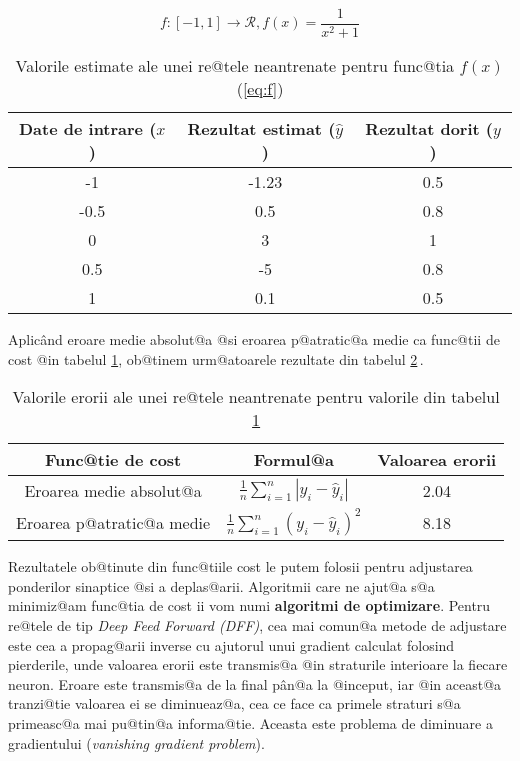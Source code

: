 \begin{equation} \label{eq:f}
	f:[-1, 1]\rightarrow \mathcal{R}, f(x) = \displaystyle\frac{1}{x^2+1}
\end{equation}

\begin{table}[h]
	\begin{center}
		\begin{tabular}{|c|c|c|}
			\hline
			Date de intrare ($x$) & Rezultat estimat ($\hat{y}$) & Rezultat dorit ($y$) \\
			\hline
			-1 & -1.23 & 0.5 \\
			\hline
			-0.5 & 0.5 & 0.8 \\
			\hline
			0 & 3 & 1 \\
			\hline
			0.5 & -5 & 0.8 \\ 
			\hline
			1 & 0.1 & 0.5 \\ 
			\hline
		\end{tabular}
	\end{center}
	\caption{Valorile estimate ale unei re@tele neantrenate pentru func@tia $f(x)$ (\ref{eq:f})}
	\label{tab:nn-functie}
\end{table}

Aplic\^ and eroare medie absolut@a @si eroarea p@atratic@a medie ca func@tii de cost @in tabelul \ref{tab:nn-functie}, ob@tinem urm@atoarele rezultate din tabelul \ref{tab:nn-erori}\,.

\begin{table}[h]
	\begin{center}
		\begin{tabular}{|c|c|c|}
			\hline
			Func@tie de cost & Formul@a & Valoarea erorii \\
			\hline
			Eroarea medie absolut@a & $\displaystyle\frac{1}{n} \sum_{i=1}^{n} |y_i - \hat{y}_i| $ & 2.04 \\
			\hline
			Eroarea p@atratic@a medie & $\displaystyle\frac{1}{n} \sum_{i=1}^{n} \left( y_i - \hat{y}_i \right)^2 $ & 8.18 \\
			\hline
		\end{tabular}
	\end{center}
	\caption{Valorile erorii ale unei re@tele neantrenate pentru valorile din tabelul \ref{tab:nn-functie}}
	\label{tab:nn-erori}
\end{table}

Rezultatele ob@tinute din func@tiile cost le putem folosii pentru adjustarea ponderilor sinaptice @si a deplas@arii. Algoritmii care ne ajut@a s@a minimiz@am func@tia de cost ii vom numi \textbf{algoritmi de optimizare}. Pentru re@tele de tip \textsl{Deep Feed Forward (DFF)}, cea mai comun@a metode de adjustare este cea a propag@arii inverse cu ajutorul unui gradient calculat folosind pierderile, unde valoarea erorii este transmis@a @in straturile interioare la fiecare neuron. Eroare este transmis@a de la final p\^ an@a la @inceput, iar @in aceast@a tranzi@tie valoarea ei se diminueaz@a, cea ce face ca primele straturi s@a primeasc@a mai pu@tin@a informa@tie. Aceasta este problema de diminuare a gradientului (\textsl{vanishing gradient problem}).

